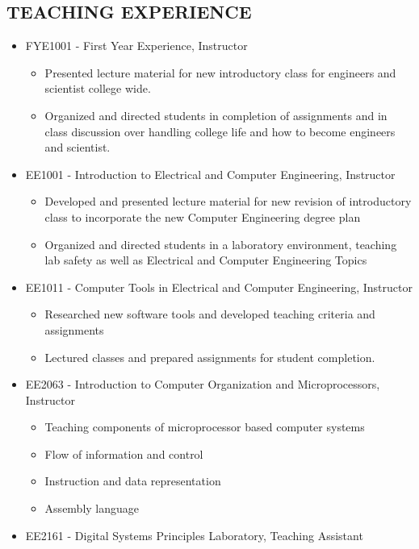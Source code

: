 \documentclass[line]{res} %
\begin{document}
\begin{resume}
\section{TEACHING EXPERIENCE}
\vspace{.3in} %

\begin{itemize}
\item FYE1001 - First Year Experience, Instructor
\begin{itemize}
\item Presented lecture material for new introductory class for engineers and scientist college wide.
\item Organized and directed students in completion of assignments and in class discussion over handling college life and how to become engineers and scientist.
\end{itemize}
\item EE1001 - Introduction to Electrical and Computer Engineering, Instructor
\begin{itemize}
\item Developed and presented lecture material for new revision of introductory class to incorporate the new Computer Engineering degree plan
\item Organized and directed students in a laboratory environment, teaching lab safety as well as Electrical and Computer Engineering Topics
\end{itemize}
\item EE1011 - Computer Tools in Electrical and Computer Engineering, Instructor
\begin{itemize}
\item Researched new software tools and developed teaching criteria and assignments
\item Lectured classes and prepared assignments for student completion.
\end{itemize}
\item EE2063 - Introduction to Computer Organization and Microprocessors, Instructor
\begin{itemize}
\item Teaching components of microprocessor based computer systems
\item Flow of information and control
\item Instruction and data representation
\item Assembly language
\end{itemize}
\item EE2161 - Digital Systems Principles Laboratory, Teaching Assistant

\end{itemize}
\end{resume}
\end{document}
